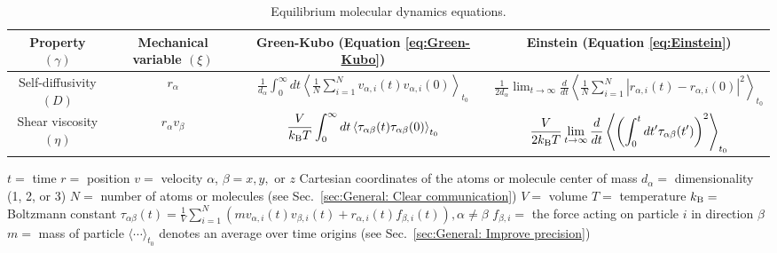 \documentclass[9pt,bestpractices]{livecoms}
\begin{document}
\begin{table}[tb]
	\caption{\label{tab:EMD_equations}Equilibrium molecular dynamics equations.}

	\begin{tabular}{c c c c}
		\toprule
		Property $(\gamma)$          & Mechanical variable $(\xi)$                        & Green-Kubo (Equation \ref{eq:Green-Kubo})    & Einstein (Equation \ref{eq:Einstein})     \\
		\midrule
		Self-diffusivity $(D)$ & $r_{\alpha}$          & $ \displaystyle \frac{1}{d_\alpha} \int_{0}^{\infty}dt\left\langle \frac{1}{N} \sum_{i=1}^{N} v_{\alpha,i}(t) v_{\alpha,i}(0)\right\rangle_{t_0}$    & $ \displaystyle \frac{1}{2d_\alpha} \lim_{t\to\infty} \frac{d}{dt} \left\langle \frac{1}{N} \sum_{i=1}^{N} |r_{\alpha,i}(t)-r_{\alpha,i}(0)|^2 \right\rangle_{t_0}$   \\
		Shear viscosity $(\eta)$       & $r_\alpha v_\beta$           & $ \displaystyle \frac{V}{k_{\rm B}T} \int_{0}^{\infty}dt\left\langle \tau_{\alpha\beta}(t) \tau_{\alpha\beta}(0)\right\rangle_{t_0}$    & $ \displaystyle \frac{V}{2k_{\rm B}T} \lim_{t\to\infty} \frac{d}{dt} \left\langle \left(\int_{0}^{t}dt' \tau_{\alpha\beta}(t')\right)^2 \right\rangle_{t_0}$  \\
		\bottomrule
	\end{tabular}
	\newline
	$t=$ time \newline
	$r=$ position \newline
	$v=$ velocity \newline
	$\alpha$, $\beta = x, y, $ or $z$ Cartesian coordinates of the atoms or molecule center of mass \newline
	$d_\alpha =$ dimensionality (1, 2, or 3) \newline
	$N=$ number of atoms or molecules (see Sec.\ \ref{sec:General: Clear communication}) \newline
	$V=$ volume \newline
	$T=$ temperature \newline
	$k_{\rm B}=$ Boltzmann constant \newline
	$\tau_{\alpha\beta}(t) = \frac{1}{V} \sum_{i=1}^{N} \left( m v_{\alpha,i}(t) v_{\beta,i}(t) + r_{\alpha,i}(t) f_{\beta,i}(t) \right) , \alpha \ne \beta$ \newline
	$f_{\beta,i}=$ the force acting on particle $i$ in direction $\beta$ \newline
	$m=$ mass of particle \newline
	$\langle \cdots \rangle_{t_0}$ denotes an average over time origins (see Sec.\ \ref{sec:General: Improve precision})
\end{table}
\end{document}
